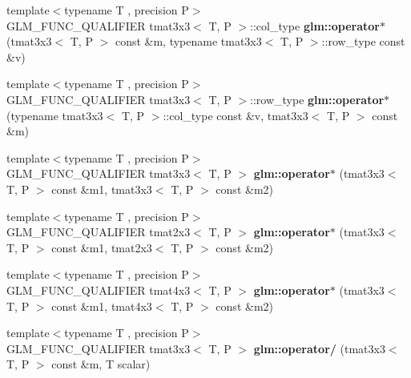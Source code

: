 \begin{DoxyCompactItemize}
{\footnotesize template$<$typename T , precision P$>$ }\\G\+L\+M\+\_\+\+F\+U\+N\+C\+\_\+\+Q\+U\+A\+L\+I\+F\+I\+ER tmat3x3$<$ T, P $>$\+::col\+\_\+type {\bfseries glm\+::operator$\ast$} (tmat3x3$<$ T, P $>$ const \&m, typename tmat3x3$<$ T, P $>$\+::row\+\_\+type const \&v)
\item 
\mbox{\label{type__mat3x3_8inl_a12af2d564dc38d2f7051131cd51d4c66}} 
{\footnotesize template$<$typename T , precision P$>$ }\\G\+L\+M\+\_\+\+F\+U\+N\+C\+\_\+\+Q\+U\+A\+L\+I\+F\+I\+ER tmat3x3$<$ T, P $>$\+::row\+\_\+type {\bfseries glm\+::operator$\ast$} (typename tmat3x3$<$ T, P $>$\+::col\+\_\+type const \&v, tmat3x3$<$ T, P $>$ const \&m)
\item 
\mbox{\label{type__mat3x3_8inl_aa501d4e3af1aca4edd6f5b6948003b32}} 
{\footnotesize template$<$typename T , precision P$>$ }\\G\+L\+M\+\_\+\+F\+U\+N\+C\+\_\+\+Q\+U\+A\+L\+I\+F\+I\+ER tmat3x3$<$ T, P $>$ {\bfseries glm\+::operator$\ast$} (tmat3x3$<$ T, P $>$ const \&m1, tmat3x3$<$ T, P $>$ const \&m2)
\item 
\mbox{\label{type__mat3x3_8inl_a9c8814fa299560df98d85fac278b4368}} 
{\footnotesize template$<$typename T , precision P$>$ }\\G\+L\+M\+\_\+\+F\+U\+N\+C\+\_\+\+Q\+U\+A\+L\+I\+F\+I\+ER tmat2x3$<$ T, P $>$ {\bfseries glm\+::operator$\ast$} (tmat3x3$<$ T, P $>$ const \&m1, tmat2x3$<$ T, P $>$ const \&m2)
\item 
\mbox{\label{type__mat3x3_8inl_a455124669156dc328dda186d05d35640}} 
{\footnotesize template$<$typename T , precision P$>$ }\\G\+L\+M\+\_\+\+F\+U\+N\+C\+\_\+\+Q\+U\+A\+L\+I\+F\+I\+ER tmat4x3$<$ T, P $>$ {\bfseries glm\+::operator$\ast$} (tmat3x3$<$ T, P $>$ const \&m1, tmat4x3$<$ T, P $>$ const \&m2)
\item 
\mbox{\label{type__mat3x3_8inl_ac5116f26b12e5e1750a14423264fbc36}} 
{\footnotesize template$<$typename T , precision P$>$ }\\G\+L\+M\+\_\+\+F\+U\+N\+C\+\_\+\+Q\+U\+A\+L\+I\+F\+I\+ER tmat3x3$<$ T, P $>$ {\bfseries glm\+::operator/} (tmat3x3$<$ T, P $>$ const \&m, T scalar)
\item 

\end{DoxyCompactItemize}
